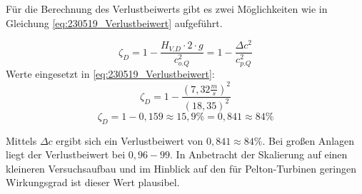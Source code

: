 Für die Berechnung des Verlustbeiwerts gibt es zwei Möglichkeiten wie in Gleichung \autoref{eq:230519_Verlustbeiwert} aufgeführt.

\begin{equation}
\zeta_D =1 - \frac{H_{V.D} \cdot 2 \cdot g}{c_{o.Q}^2}= 1 - \frac{\Delta c^2}{c_{p.Q}^2}
\label{eq:230519_Verlustbeiwert}
\end{equation}
Werte eingesetzt in \autoref{eq:230519_Verlustbeiwert}:
$$\zeta_{D} = 1 - \frac{(7,32\frac{m}{s})^2}{(18,35)^2}$$
$$ \zeta_{D} = 1 - 0,159 \approx 15,9\% = 0,841 \approx 84\% $$

Mittels $\Delta c$ ergibt sich ein Verlustbeiwert von $0,841 \approx 84\%$.
Bei großen Anlagen liegt der Verlustbeiwert bei $0,96-99$. 
In Anbetracht der Skalierung auf einen kleineren Versuchsaufbau und im Hinblick auf den für Pelton-Turbinen geringen Wirkungsgrad ist dieser Wert plausibel.